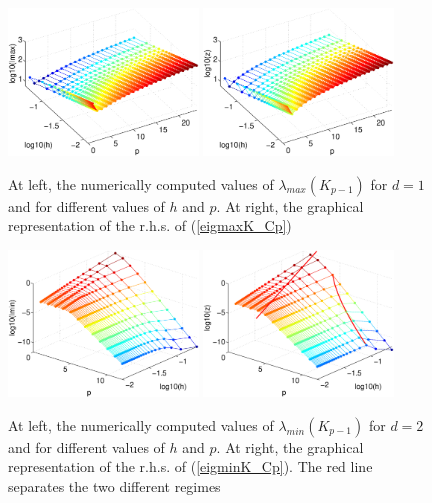 \documentclass[11pt]{article}
\begin{document}
\begin{figure}
\begin{center}
\includegraphics[width=0.45\textwidth]{Images/igap_eigK1max.eps}\quad
\includegraphics[width=0.45\textwidth]{Images/igap_eigK1smax.eps}\\
\end{center}
\caption{At left, the numerically computed values of
$\lambda_{max}(K_{p-1})$ for $d=1$ and
for different values of $h$ and $p$. At right,
the graphical representation of the r.h.s. of (\ref{eigmaxK_Cp})}
\label{fig:stiffmax-igapd1}
\end{figure}
\begin{figure}
\begin{center}
\includegraphics[width=0.45\textwidth]{Images/igap_eigK2min.eps}\quad
\includegraphics[width=0.45\textwidth]{Images/igap_eigK2smin.eps}\\
\end{center}
\caption{At left, the numerically computed values of
$\lambda_{min}(K_{p-1})$ for $d=2$ and
for different values of $h$ and $p$. At right,
the graphical representation of the r.h.s. of (\ref{eigminK_Cp}). The red line
separates the two different regimes}
\label{fig:stiffmin-igapd2}
\end{figure}
\end{document}
